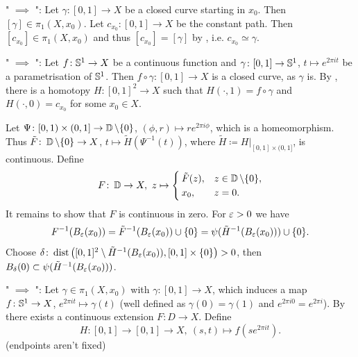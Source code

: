 \documentclass[a4paper,english]{article}
\begin{document}
\begin{pr}
    " $\implies$ ":
    Let $\gamma \colon [0, 1] \to X$ be a closed curve starting in $x_0$.
    Then $[\gamma] \in \pi_1(X, x_0)$.
    Let $c_{x_0} \colon [0, 1] \to X$ be the constant path.
    Then $[c_{x_0}] \in \pi_1(X, x_0)$ and thus $[c_{x_0}] = [\gamma]$ by , i.e. $c_{x_0} \simeq \gamma$.
    
    " $\implies$ ":
    Let $f \colon \S^1 \to X$ be a continuous function and $\gamma \colon [0, 1] \to \S^1$, $t \mapsto e^{2 \pi i t}$ be a parametrisation of $\S^1$.
    Then $f \circ \gamma \colon [0, 1] \to X$ is a closed curve, as $\gamma$ is.
    By , there is a homotopy $H \colon [0, 1]^2 \to X$ such that $H(\cdot, 1) = f \circ \gamma$ and $H(\cdot, 0) = c_{x_0}$ for some $x_0 \in X$.
    
    Let $\Psi \colon [0, 1) \times (0, 1] \to \D \setminus \{ 0 \}$, $(\phi, r) \mapsto r e^{2 \pi i \phi}$, which is a homeomorphism.
    Thus $\tilde{F} \colon \D \setminus \{ 0 \} \to X$, $t \mapsto \tilde{H}(\Psi^{-1}(t))$, where $\tilde{H} \coloneqq H|_{[0, 1] \times (0, 1]}$, is continuous.
    Define
    \begin{equation*}
        F \colon \D \to X, \ 
        z \mapsto \begin{cases}
            \tilde{F}(z), & z \in \D \setminus \{ 0 \}, \\
            x_0, & z = 0.
        \end{cases}
    \end{equation*}
    It remains to show that $F$ is continuous in zero. For $\eps > 0$ we have
    \begin{equation*}
        F^{-1}(B_{\eps}(x_0))
        = \tilde{F}^{-1}(B_{\eps}(x_0)) \cup \{ 0 \}
        = \psi(\tilde{H}^{-1}(B_{\eps}(x_0))) \cup \{ 0 \}.
    \end{equation*}
    Choose $\delta \colon \dist\big([0, 1]^2 \setminus \tilde{H}^{-1}(B_{\eps}(x_0)), [0, 1] \times \{ 0 \}\big) > 0$, then $B_{\delta}(0) \subset \psi(\tilde{H}^{-1}(B_{\eps}(x_0)))$.

    " $\implies$ ":
    Let $\gamma \in \pi_1(X, x_0)$ with $\gamma \colon [0, 1] \to X$, which induces a map $f \colon \S^1 \to X$, $e^{2 \pi i t} \mapsto \gamma(t)$ (well defined as $\gamma(0) = \gamma(1)$ and $e^{2 \pi i 0} = e^{2 \pi i}$).
    By \circled{3} there exists a continuous extension $F \colon D \to X$.
    Define
    \begin{equation*}
        H \colon [0, 1] \to [0, 1] \to X, \ 
        (s, t) \mapsto f(s e^{2 \pi i t}).
    \end{equation*}
    (endpoints aren't fixed)
\end{pr}
\end{document}
